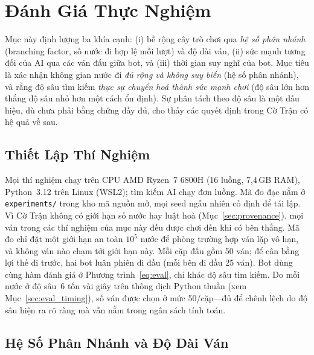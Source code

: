 \section{Đánh Giá Thực Nghiệm}
\label{sec:eval}

Mục này định lượng ba khía cạnh: (i) bề rộng cây trò chơi qua \emph{hệ số
phân nhánh} (branching factor, số nước đi hợp lệ mỗi lượt) và độ dài ván,
(ii) sức mạnh tương đối của AI qua các ván đấu giữa bot, và (iii) thời gian
suy nghĩ của bot.
Mục tiêu là xác nhận không gian nước đi \emph{đủ rộng và không suy biến}
(hệ số phân nhánh), và rằng độ sâu tìm kiếm \emph{thực sự chuyển hoá thành
sức mạnh chơi} (độ sâu lớn hơn thắng độ sâu nhỏ hơn một cách ổn định). Sự
phân tách theo độ sâu là một dấu hiệu, dù chưa phải bằng chứng đầy đủ, cho
thấy các quyết định trong Cờ Trận có hệ quả về sau.

\subsection{Thiết Lập Thí Nghiệm}
\label{sec:eval_setup}

Mọi thí nghiệm chạy trên CPU AMD Ryzen~7 6800H (16 luồng, 7{,}4\,GB RAM),
Python~3.12 trên Linux (WSL2); tìm kiếm AI chạy đơn luồng. Mã đo đạc nằm ở
\texttt{experiments/} trong kho mã nguồn mở, mọi seed ngẫu nhiên cố định để
tái lập. Vì Cờ Trận không có giới hạn số nước hay luật hoà
(Mục~\ref{sec:provenance}), mọi ván trong các thí nghiệm của mục này đều
được chơi đến khi có bên thắng. Mã đo chỉ đặt một giới hạn an toàn $10^5$
nước để phòng trường hợp ván lặp vô hạn, và không ván nào chạm tới giới hạn
này. Mỗi cặp đấu gồm 50 ván; để cân bằng lợi thế đi trước, hai bot luân
phiên đi đầu (mỗi bên đi đầu 25 ván). Bot dùng cùng hàm đánh giá
ở Phương trình~\eqref{eq:eval}, chỉ khác độ sâu tìm kiếm. Do mỗi nước ở độ
sâu~6 tốn vài giây trên thông dịch Python thuần (xem
Mục~\ref{sec:eval_timing}), số ván được chọn ở mức 50/cặp---đủ để chênh lệch
do độ sâu hiện ra rõ ràng mà vẫn nằm trong ngân sách tính toán.

\subsection{Hệ Số Phân Nhánh và Độ Dài Ván}
\label{sec:eval_branching}

